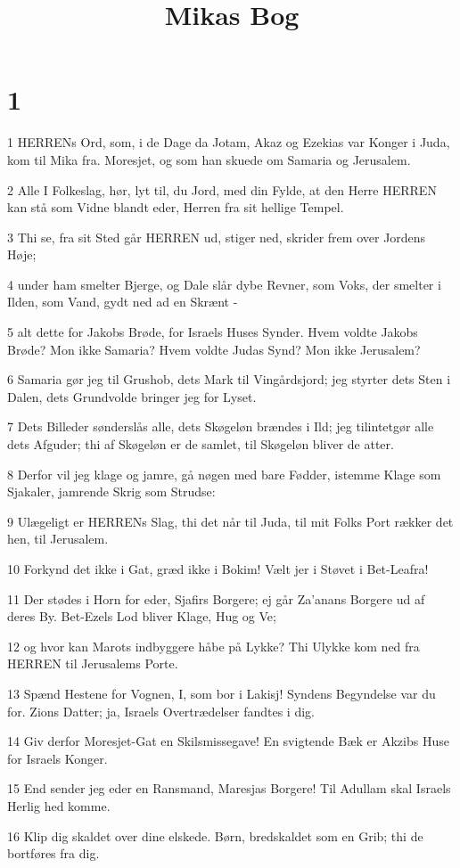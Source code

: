 

\title{Mikas Bog}


\chapter{1}

\par 1 HERRENs Ord, som, i de Dage da Jotam, Akaz og Ezekias var Konger i Juda, kom til Mika fra. Moresjet, og som han skuede om Samaria og Jerusalem.
\par 2 Alle I Folkeslag, hør, lyt til, du Jord, med din Fylde, at den Herre HERREN kan stå som Vidne blandt eder, Herren fra sit hellige Tempel.
\par 3 Thi se, fra sit Sted går HERREN ud, stiger ned, skrider frem over Jordens Høje;
\par 4 under ham smelter Bjerge, og Dale slår dybe Revner, som Voks, der smelter i Ilden, som Vand, gydt ned ad en Skrænt -
\par 5 alt dette for Jakobs Brøde, for Israels Huses Synder. Hvem voldte Jakobs Brøde? Mon ikke Samaria? Hvem voldte Judas Synd? Mon ikke Jerusalem?
\par 6 Samaria gør jeg til Grushob, dets Mark til Vingårdsjord; jeg styrter dets Sten i Dalen, dets Grundvolde bringer jeg for Lyset.
\par 7 Dets Billeder sønderslås alle, dets Skøgeløn brændes i Ild; jeg tilintetgør alle dets Afguder; thi af Skøgeløn er de samlet, til Skøgeløn bliver de atter.
\par 8 Derfor vil jeg klage og jamre, gå nøgen med bare Fødder, istemme Klage som Sjakaler, jamrende Skrig som Strudse:
\par 9 Ulægeligt er HERRENs Slag, thi det når til Juda, til mit Folks Port rækker det hen, til Jerusalem.
\par 10 Forkynd det ikke i Gat, græd ikke i Bokim! Vælt jer i Støvet i Bet-Leafra!
\par 11 Der stødes i Horn for eder, Sjafirs Borgere; ej går Za'anans Borgere ud af deres By. Bet-Ezels Lod bliver Klage, Hug og Ve;
\par 12 og hvor kan Marots indbyggere håbe på Lykke? Thi Ulykke kom ned fra HERREN til Jerusalems Porte.
\par 13 Spænd Hestene for Vognen, I, som bor i Lakisj! Syndens Begyndelse var du for. Zions Datter; ja, Israels Overtrædelser fandtes i dig.
\par 14 Giv derfor Moresjet-Gat en Skilsmissegave! En svigtende Bæk er Akzibs Huse for Israels Konger.
\par 15 End sender jeg eder en Ransmand, Maresjas Borgere! Til Adullam skal Israels Herlig hed komme.
\par 16 Klip dig skaldet over dine elskede. Børn, bredskaldet som en Grib; thi de bortføres fra dig.

